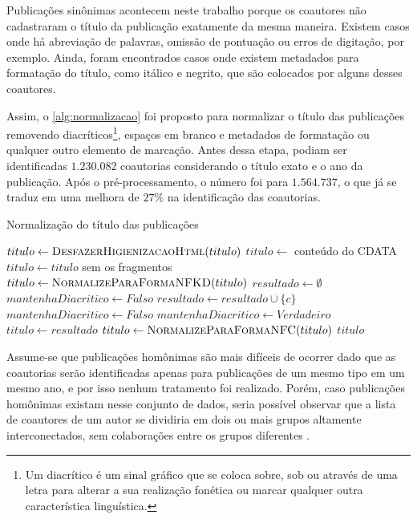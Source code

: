 Publicações sinônimas acontecem neste trabalho porque os coautores não cadastraram o título da publicação exatamente da mesma maneira. Existem casos onde há abreviação de palavras, omissão de pontuação ou erros de digitação, por exemplo. Ainda, foram encontrados casos onde existem metadados para formatação do título, como itálico e negrito, que são colocados por alguns desses coautores.

Assim, o \autoref{alg:normalizacao} foi proposto para normalizar o título das publicações removendo diacríticos\footnote{Um diacrítico é um sinal gráfico que se coloca sobre, sob ou através de uma letra para alterar a sua realização fonética ou marcar qualquer outra característica linguística.}, espaços em branco e metadados de formatação ou qualquer outro elemento de marcação. Antes dessa etapa, podiam ser identificadas $1.230.082$ coautorias considerando o título exato e o ano da publicação. Após o pré-processamento, o número foi para $1.564.737$, o que já se traduz em uma melhora de $27$\% na identificação das coautorias.

\begin{algorithm}
\caption{Normalização do título das publicações}
\label{alg:normalizacao}
\begin{algorithmic}[1]
    \State $titulo \gets \Call{DesfazerHigienizacaoHtml}{titulo}$ 
        \State $titulo \gets$ conteúdo do CDATA 
    \EndIf
        \State $titulo \gets titulo$ sem os fragmentos  
    \EndIf
    \State $titulo \gets \Call{NormalizeParaFormaNFKD}{titulo}$
    \State $resultado \gets \emptyset$
    \State $mantenhaDiacritico \gets Falso$
            \State $resultado \gets resultado \cup \{c\}$
                \State $mantenhaDiacritico \gets Falso$
            \Else
                \State $mantenhaDiacritico \gets Verdadeiro$
            \EndIf
        \EndIf
    \EndFor
    \State $titulo\gets resultado$
    \State $titulo\gets \Call{NormalizeParaFormaNFC}{titulo}$
    \State \Return $titulo$
\EndProcedure
\end{algorithmic}
\end{algorithm}

Assume-se que publicações homônimas são mais difíceis de ocorrer dado que as coautorias serão identificadas apenas para publicações de um mesmo tipo em um mesmo ano, e por isso nenhum tratamento foi realizado. Porém, caso publicações homônimas existam nesse conjunto de dados, seria possível observar que a lista de coautores de um autor se dividiria em dois ou mais grupos altamente interconectados, sem colaborações entre os grupos diferentes \cite{franceschet2011collaboration}.


